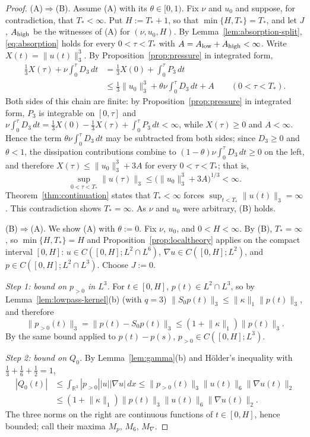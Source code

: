 \documentclass[11pt]{article}
\theoremstyle{definition}
\theoremstyle{plain}
\newcommand{\R}{\mathbb R}
\newcommand{\norm}[1]{\lVert #1\rVert}
\begin{document}
\begin{proof}
(A)$\Rightarrow$(B).  Assume (A) with its $\theta\in[0,1)$.  Fix $\nu$ and
$u_0$ and suppose, for contradiction, that $T_*<\infty$.  Put $H:=T_*+1$,
so that $\min\{H,T_*\}=T_*$, and let $J$, $A_{\rm high}$ be the witnesses of
(A) for $(\nu,u_0,H)$.  By Lemma~\ref{lem:absorption-split},
\eqref{eq:absorption} holds for every $0<\tau<T_*$ with
$A=A_{\rm low}+A_{\rm high}<\infty$.  Write $X(t)=\norm{u(t)}_3^3$.  By
Proposition~\ref{prop:pressure} in integrated form,
\[
\begin{aligned}
 \tfrac13X(\tau)+\nu\int_0^\tau D_3\,dt
 &=\tfrac13X(0)+\int_0^\tau P_3\,dt\\
 &\le\tfrac13\norm{u_0}_3^3+\theta\nu\int_0^\tau D_3\,dt+A
 \qquad(0<\tau<T_*).
\end{aligned}
\]
Both sides of this chain are finite: by Proposition~\ref{prop:pressure} in
integrated form, $P_3$ is integrable on $[0,\tau]$ and
$\nu\int_0^\tau D_3\,dt=\tfrac13X(0)-\tfrac13X(\tau)+\int_0^\tau P_3\,dt<\infty$,
while $X(\tau)\ge0$ and $A<\infty$.  Hence the term
$\theta\nu\int_0^\tau D_3\,dt$ may be subtracted from both sides; since
$D_3\ge0$ and $\theta<1$, the dissipation contributions combine to
$(1-\theta)\nu\int_0^\tau D_3\,dt\ge0$ on the left, and therefore
$X(\tau)\le\norm{u_0}_3^3+3A$ for every $0<\tau<T_*$; that is,
\[
 \sup_{0<\tau<T_*}\norm{u(\tau)}_3\le\bigl(\norm{u_0}_3^3+3A\bigr)^{1/3}<\infty .
\]
Theorem~\ref{thm:continuation} states that $T_*<\infty$ forces
$\sup_{t<T_*}\norm{u(t)}_3=\infty$.  This contradiction shows $T_*=\infty$.
As $\nu$ and $u_0$ were arbitrary, (B) holds.

(B)$\Rightarrow$(A).  We show (A) with $\theta:=0$.  Fix $\nu$, $u_0$, and
$0<H<\infty$.  By (B), $T_*=\infty$, so $\min\{H,T_*\}=H$ and
Proposition~\ref{prop:localtheory} applies on the compact interval $[0,H]$:
$u\in C([0,H];L^2\cap L^6)$, $\nabla u\in C([0,H];L^2)$, and
$p\in C([0,H];L^2\cap L^3)$.  Choose $J:=0$.

\emph{Step 1: bound on $p_{>0}$ in $L^3$.}  For $t\in[0,H]$,
$p(t)\in L^2\cap L^3$, so by Lemma~\ref{lem:lowpass-kernel}(b) (with $q=3$)
$\norm{S_0p(t)}_3\le\norm\kappa_1\norm{p(t)}_3$, and therefore
\[
 \norm{p_{>0}(t)}_3=\norm{p(t)-S_0p(t)}_3\le(1+\norm\kappa_1)\norm{p(t)}_3 .
\]
By the same bound applied to $p(t)-p(s)$, $p_{>0}\in C([0,H];L^3)$.

\emph{Step 2: bound on $Q_0$.}  By Lemma~\ref{lem:gamma}(b) and H\"older's
inequality with $\tfrac13+\tfrac16+\tfrac12=1$,
\[
\begin{aligned}
 |Q_0(t)|
 &\le\int_{\R^3}|p_{>0}||u||\nabla u|\,dx
 \le\norm{p_{>0}(t)}_3\norm{u(t)}_6\norm{\nabla u(t)}_2\\
 &\le(1+\norm\kappa_1)\norm{p(t)}_3\norm{u(t)}_6\norm{\nabla u(t)}_2 .
\end{aligned}
\]
The three norms on the right are continuous functions of $t\in[0,H]$,
hence bounded; call their maxima $M_p$, $M_6$, $M_\nabla$.


\end{proof}
\end{document}

